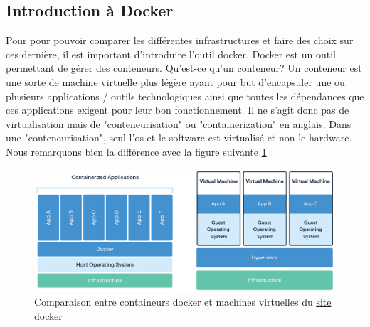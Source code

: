 \documentclass[
    iai, %
    il, %
]{heig-tb}
\begin{document}
\subsection{Introduction à Docker}
Pour pour pouvoir comparer les différentes infrastructures et faire des choix sur ces dernière, il est important d'introduire l'outil \Gls{docker}.\newline
Docker est un outil permettant de gérer des conteneurs.\newline
Qu'est-ce qu'un conteneur? Un \Gls{conteneur} est une sorte de machine virtuelle plus légère ayant pour but d'encapsuler une ou plusieurs applications / outils technologiques ainsi que toutes les dépendances que ces applications exigent pour leur bon fonctionnement.\newline
Il ne s'agit donc pas de virtualisation mais de "conteneurisation" ou "containerization" en anglais.
Dans une "conteneurisation", seul l'\Gls{os} et le software est virtualisé et non le hardware.\newline
Nous remarquons bien la différence avec la figure suivante \ref{docker-compare}

\begin{center}
    \begin{figure}
        \includegraphics[width=\textwidth]{./assets/figures/docker-containerized-and-vm.png}
        \caption[Comparaison Docker vs VM]{Comparaison entre containeurs docker et machines virtuelles
            du \href{https://www.docker.com/wp-content/uploads/2021/11/}{site docker}
            \label{docker-compare}}
    \end{figure}
\end{center}
\end{document}
